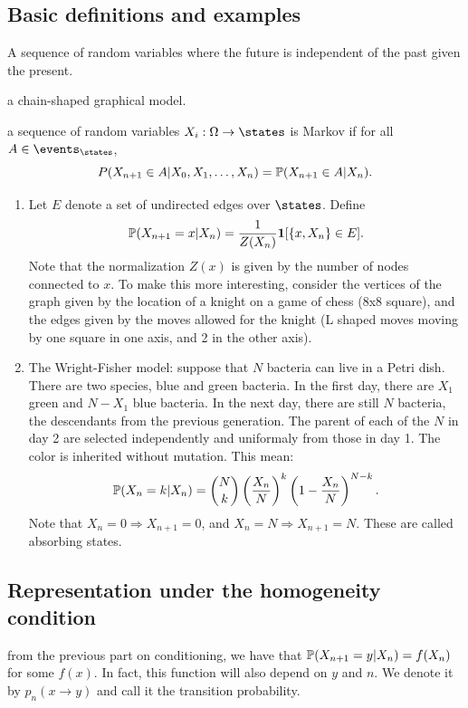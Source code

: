 \documentclass{article}
\begin{document}
\subsection{Basic definitions and examples}

 A sequence of random variables where the future is independent of the past given the present.

 a chain-shaped graphical model.

 a sequence of random variables $X_i : \Omega \to \states$ is Markov if for all $A \in \events_\states$, 
\[ P(X_{n+1} \in A | X_0, X_1, \dots, X_n) = \P(X_{n+1} \in A | X_n). \]

\begin{enumerate}
  \item Let $E$ denote a set of undirected edges over $\states$. Define \[ \P(X_{n+1} = x | X_n) = \frac{1}{Z(X_n)} \1[\{x, X_n\} \in E]. \]Note that the normalization $Z(x)$ is given by the number of nodes connected to $x$. To make this more interesting, consider the vertices of the graph given by the location of a knight on a game of chess (8x8 square), and the edges given by the moves allowed for the knight (L shaped moves moving by one square in one axis, and 2 in the other axis). 
  \item The Wright-Fisher model: suppose that $N$ bacteria can live in a Petri dish. There are two species, blue and green bacteria. In the first day, there are $X_1$ green and $N-X_1$ blue bacteria. In the next day, there are still $N$ bacteria, the descendants from the previous generation. The parent of each of the $N$ in day 2 are selected independently and uniformaly from those in day 1. The color is inherited without mutation. This mean: \[ \P(X_n = k | X_n) = \binom{N}{k} \left(\frac{X_n}{N}\right)^k \left( 1 - \frac{X_n}{N}\right)^{N-k}. \]Note that $X_n = 0 \Rightarrow X_{n+1} = 0$, and $X_n = N \Rightarrow X_{n+1} = N$. These are called absorbing states.  
\end{enumerate}


\subsection{Representation under the homogeneity condition}

 from the previous part on conditioning, we have that $\P(X_{n+1} = y | X_n) = f(X_n)$ for some $f(x)$. In fact, this function will also depend on $y$ and $n$. We denote it by $p_n(x \to y)$ and call it the transition probability.
\end{document}
